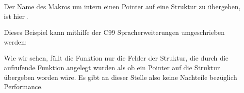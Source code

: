 

Der Name des Makros um intern einen Pointer auf eine Struktur zu übergeben, ist hier .

Dieses Beispiel kann mithilfe der C99 Spracherweiterungen umgeschrieben werden:




Wie wir sehen, füllt die Funktion nur die Felder der Struktur, die durch die aufrufende Funktion angelegt wurden als ob
ein Pointer auf die Struktur übergeben worden wäre. Es gibt an dieser Stelle also keine Nachteile bezüglich Performance.